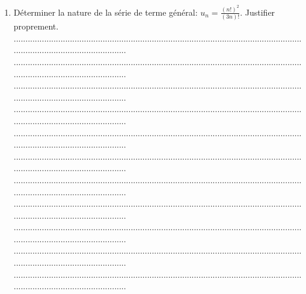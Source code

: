 \documentclass{article}
\begin{document}
\begin{footnotesize}
\begin{enumerate}
    \item Déterminer la nature de la série de terme général: $u_{n} = \frac{(n!)^{2}}{(3n)!}$. Justifier proprement.\newline\newline
    ...........................................................................................................................................................................\newline
    ...........................................................................................................................................................................\newline
    ...........................................................................................................................................................................\newline
    ...........................................................................................................................................................................\newline
    ...........................................................................................................................................................................\newline
    ...........................................................................................................................................................................\newline
    ...........................................................................................................................................................................\newline
    ...........................................................................................................................................................................\newline
    ...........................................................................................................................................................................\newline
    ...........................................................................................................................................................................\newline
    ...........................................................................................................................................................................\newline

\end{enumerate}
\end{footnotesize}
\end{document}
